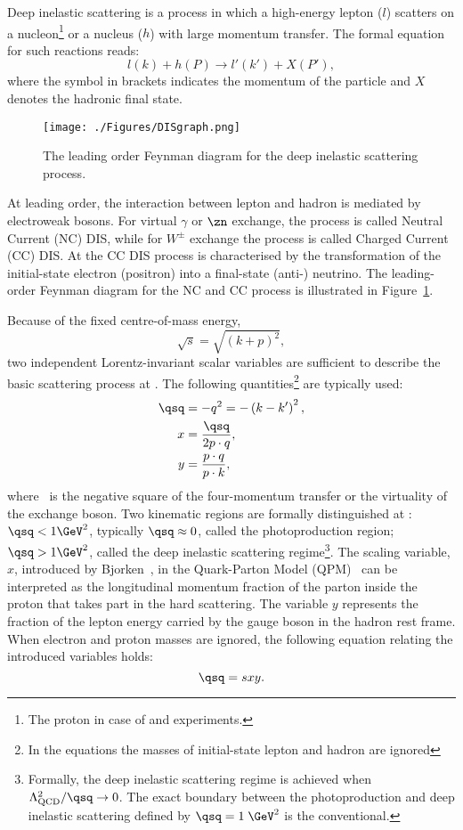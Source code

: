 Deep inelastic scattering is a process in which a high-energy lepton ($l$) scatters on a nucleon\footnote{The proton in case of \hone and \zeus experiments.} or a nucleus ($h$) with large momentum transfer. The formal equation for such reactions reads:
\[
l\left( k \right) + h\left( P \right) \rightarrow l'\left( k' \right) + X\left( P' \right),
\]
where the symbol in brackets indicates the momentum of the particle and $X$ denotes the hadronic final state.
\begin{figure}
	\centering
		\texttt{[image: ./Figures/DISgraph.png]}
	\caption{The leading order Feynman diagram for the deep inelastic scattering process.}
	\label{fig:DISgraph}
\end{figure}
At leading order, the interaction between lepton and hadron is mediated by electroweak bosons. For virtual $\gamma$ or $\zn$ exchange, the process is called Neutral Current (NC) DIS, while for $W^\pm$ exchange the process is called Charged Current (CC) DIS. At \hera the CC DIS process is characterised by the transformation of the initial-state electron (positron) into a final-state (anti-) neutrino. The leading-order Feynman diagram for the NC and CC process is illustrated in Figure~\ref{fig:DISgraph}.

Because of the fixed centre-of-mass energy, 
\begin{equation}
\sqrt{s}=\sqrt{\left(k+p\right)^2},
\end{equation} 
two independent Lorentz-invariant scalar variables are sufficient to describe the basic scattering process at \hera. The following quantities\footnote{In the equations the masses of initial-state lepton and hadron are ignored} are typically used:
\begin{align}
\qsq &= -q^2 = -\left( k - k' \right)^2,\\
     x &= \frac{\qsq}{2p\cdot q},\\
		 y &= \frac{p\cdot q}{p\cdot k},
\label{eq:vardefinit}
\end{align}
where \qsq\, is the negative square of the four-momentum transfer or the virtuality of the exchange boson. Two kinematic regions are formally distinguished at \hera: $\qsq < 1\GeV^2$, typically $\qsq \approx 0$, called the photoproduction region; $\qsq > 1 \GeV^2$, called the deep inelastic scattering regime\footnote{Formally, the deep inelastic scattering regime is achieved when $\Lambda_\text{QCD}^2/\qsq \rightarrow 0$. The exact boundary between the photoproduction and deep inelastic scattering defined by $\qsq = 1\;\GeV^2$ is the conventional.}. The scaling variable, $x$, introduced by Bjorken~\cite{Bjorken:1968dy}, in the Quark-Parton Model (QPM)~\cite{Feynman:1969ej,Feynman:1973xc} can be interpreted as the longitudinal momentum fraction of the parton inside the proton that takes part in the hard scattering. The variable $y$ represents the fraction of the lepton energy carried by the gauge boson in the hadron rest frame. When electron and proton masses are ignored, the following equation relating the introduced variables holds:
\begin{equation}
\qsq = sxy.
\label{eq:qsxy}
\end{equation}


